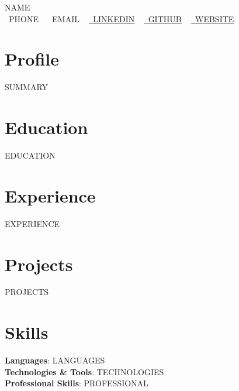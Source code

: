 \documentclass[a4paper,10pt]{article}
\newcommand{\resumeSubHeadingListStart}{\begin{itemize}[leftmargin=0.0in, label={}]}
\newcommand{\resumeSubHeadingListEnd}{\end{itemize}}
\begin{document}
\begin{center}
    {\Huge \scshape {{NAME}}} \\ \vspace{5pt}
    \small \raisebox{-0.1\height}\faPhone\ {{PHONE}} ~
    \small \raisebox{-0.1\height}\faEnvelope\ {{EMAIL}} ~
    \href{https://{{LINKEDIN}}}{\raisebox{-0.2\height}\faLinkedin\ \underline{{{LINKEDIN}}}} ~
    \href{https://{{GITHUB}}}{\raisebox{-0.2\height}\faGithub\ \underline{{{GITHUB}}}} ~
    \href{https://{{WEBSITE}}}{\raisebox{-0.2\height}\faGlobe\ \underline{{{WEBSITE}}}}
    \vspace{-6pt}
\end{center}

\section{Profile}
\small{{{SUMMARY}}}
\vspace{-6pt}

\section{Education}
  \resumeSubHeadingListStart
{{EDUCATION}}
  \resumeSubHeadingListEnd
\vspace{-6pt}

\section{Experience}
  \vspace{-4pt}
    \resumeSubHeadingListStart
{{EXPERIENCE}}
    \resumeSubHeadingListEnd
\vspace{-8pt}

\section{Projects}
    \vspace{-4pt}
    \resumeSubHeadingListStart
{{PROJECTS}}
    \resumeSubHeadingListEnd
\vspace{-8pt}

\section{Skills}
 \begin{itemize}[leftmargin=0.15in, label={}]
    \small{\item{
     \textbf{Languages}{: {{LANGUAGES}}} \\
     \textbf{Technologies \& Tools}{: {{TECHNOLOGIES}}} \\
     \textbf{Professional Skills}{: {{PROFESSIONAL}}} \\
    }}
 \end{itemize}
 \vspace{-12pt}
\end{document}
